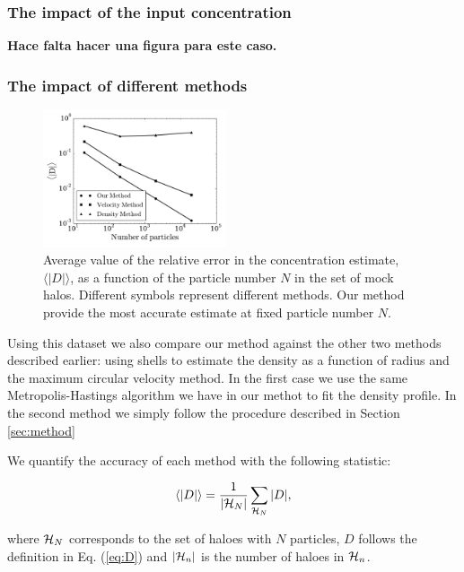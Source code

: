 \documentclass[useAMS,usenatbib]{mn2e}
\newcommand{\avg}[1]{\langle{#1}\rangle}
\begin{document}
\subsubsection{The impact of the input concentration}

{\bf Hace falta hacer una figura para este caso.}

\subsubsection{The impact of different methods}

\begin{figure}
\begin{center}
  \includegraphics[width=0.48\textwidth]{error.pdf}
\end{center}
\caption{Average value of the relative error in the concentration
  estimate, $\avg{|D|}$, as a function of the particle number $N$ in
  the set of mock halos. Different symbols represent different
  methods. Our method provide the most accurate estimate at fixed
  particle number $N$.
    \label{fig:error}}
\end{figure}


Using this dataset we also compare our method against the other two
methods described earlier: using shells to estimate the density as a
function of radius and the maximum circular velocity method.
In the first case we use the same Metropolis-Hastings algorithm we
have in our methot to fit the density profile.
In the second method we simply follow the procedure described in
Section \ref{sec:method}

We quantify the accuracy of each method with the following statistic:

\begin{equation}
\avg{|D|}=\frac{1}{\left|{\cal{H}}_N\right|}\sum_{{\cal{H}}_N} |D|,
\end{equation}

where ${\cal{H}}_N$ corresponds to the set of haloes with $N$
particles, $D$ follows the definition in Eq. (\ref{eq:D}) and
$\left|{\cal{H}}_n\right|$ is the number of haloes in ${\cal{H}}_n$.
\end{document}
